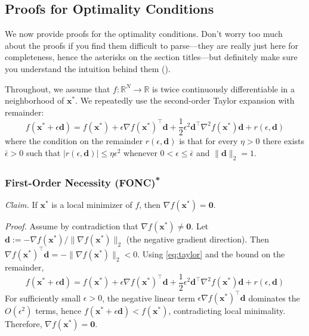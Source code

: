 \subsection{Proofs for Optimality Conditions}
We now provide proofs for the optimality conditions. Don't worry too much about the proofs if you find them difficult to parse---they are really just here for completeness, hence the asterisks on the section titles---but definitely make sure you understand the intuition behind them ().

Throughout, we assume that $f:\mathbb{R}^N\to\mathbb{R}$ is twice continuously differentiable in a neighborhood of $\mathbf{x}^*$. We repeatedly use the second-order Taylor expansion with remainder:
\begin{equation}\label{eq:taylor}
f(\mathbf{x}^* + \epsilon \mathbf{d})
= f(\mathbf{x}^*) 
  + \epsilon \nabla f(\mathbf{x}^*)^\top \mathbf{d}
  + \frac{1}{2}\epsilon^2 \mathbf{d}^\top \nabla^2 f(\mathbf{x}^*) \mathbf{d}
  + r(\epsilon,\mathbf{d})
\end{equation}
where the condition on the remainder $r(\epsilon,\mathbf{d})$ is that for every $\eta>0$ there exists $\bar{\epsilon}>0$ such that 
$\bigl|r(\epsilon,\mathbf{d})\bigr|\le \eta \epsilon^2$ whenever $0<\epsilon\le \bar{\epsilon}$ and $\|\mathbf{d}\|_2=1$.

\subsubsection{\texorpdfstring{First-Order Necessity (FONC)\textsuperscript{*}}{First-Order Necessity (FONC)}}
\emph{Claim.} If $\mathbf{x}^*$ is a local minimizer of $f$, then $\nabla f(\mathbf{x}^*)=\mathbf{0}$.

\emph{Proof.}
Assume by contradiction that $\nabla f(\mathbf{x}^*)\neq \mathbf{0}$. Let $\mathbf{d} := -\nabla f(\mathbf{x}^*)/\|\nabla f(\mathbf{x}^*)\|_2$ (the negative gradient direction). Then $\nabla f(\mathbf{x}^*)^\top \mathbf{d} = -\|\nabla f(\mathbf{x}^*)\|_2 < 0$. Using \autoref{eq:taylor} and the bound on the remainder,
\begin{equation}
f(\mathbf{x}^* + \epsilon \mathbf{d})
= f(\mathbf{x}^*) + \epsilon \nabla f(\mathbf{x}^*)^\top \mathbf{d} 
  + \frac{1}{2}\epsilon^2 \mathbf{d}^\top \nabla^2 f(\mathbf{x}^*) \mathbf{d} + r(\epsilon,\mathbf{d})
\end{equation}
For sufficiently small $\epsilon>0$, the negative linear term $\epsilon \nabla f(\mathbf{x}^*)^\top \mathbf{d}$ dominates the $O(\epsilon^2)$ terms, hence
$f(\mathbf{x}^*+\epsilon \mathbf{d}) < f(\mathbf{x}^*)$, contradicting local minimality. Therefore, $\nabla f(\mathbf{x}^*)=\mathbf{0}$.

